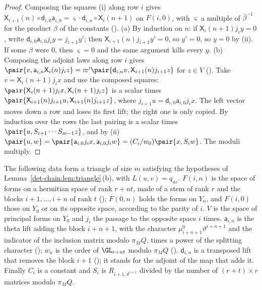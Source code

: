\begin{proof}
Composing the squares (i) along row $i$ gives
$\mathsf X_{i+1}(n)\circ \mathsf d_{i,0}\mathsf a_{i,0}=\varsigma\cdot \mathsf d_{i,n}\circ \mathsf X_i(n+1)$ on $F(i,0)$, with $\varsigma$ a multiple of
$\bar\beta^{-1}$ for the product $\beta$ of the constants
(). (a) By induction on $n$: if
$\mathsf X_i(n+1)j_iy=0$, write $\mathsf d_{i,0}\mathsf a_{i,0}j_iy=j_{i+1}y'$; then $\mathsf X_{i+1}(n)j_{i+1}y'=0$, so $y'=0$, so
$y=0$ by (ii). If some $\beta$ were $0$, then $\varsigma=0$ and the same argument kills every $y$.
(b) Composing the adjoint laws along row $i$ gives
$\pair{v,\mathsf a_{i,n}\mathsf X_i(n)j_iz}=\varpi'\pair{\mathsf d_{i,n}v,\mathsf X_{i+1}(n)j_{i+1}z}$ for $z\in V$
(). Take $v=\mathsf X_i(n+1)j_ix$ and use the composed
squares: $\pair{\mathsf X_i(n+1)j_ix,\mathsf X_i(n+1)j_iz}$ is a scalar times
$\pair{\mathsf X_{i+1}(n)j_{i+1}u,\mathsf X_{i+1}(n)j_{i+1}z}$, where $j_{i+1}u=\mathsf d_{i,0}\mathsf a_{i,0}j_ix$. The left
vector moves down a row and loses its first lift; the right one is only copied. By induction over
the rows the last pairing is a scalar times $\pair{u,S_{i+1}\cdots S_{m-1}z}$, and by (ii)
$\pair{u,w}=\pair{\mathsf a_{i,0}j_ix,\mathsf a_{i,0}j_iw}=(C_i/w_0)\pair{x,S_iw}$. The moduli multiply.
\end{proof}

\begin{theorem}
\label{det-chain:thm:triangle}
The following data form a triangle of size $m$ satisfying the hypotheses of
Lemma~\ref{det-chain:lem:triangle}\,(b), with $L(u,v)=q_{uv}$. $F(i,n)$ is the space of forms on a
hermitian space of rank $r+nt$, made of a stem of rank $r$ and the blocks $i+1,\dots,i+n$ of rank
$t$ (); $F(0,n)$ holds the forms on $Y_n$, and $F(i,0)$ those on $Y_0$
or on its opposite space, according to the parity of $i$. $V$ is the space of principal forms on $Y_0$ and $j_i$ the
passage to the opposite space $i$ times. $\mathsf a_{i,n}$ is the theta lift adding the block $i+n+1$, with
the character $\mu^0_{i+n+1}\vartheta^{i+n+1}$ and the indicator of the inclusion matrix modulo
$\pi_MQ$, times a power of the splitting character (); $w_n$ is the
order of $\GL_{r+nt}$ modulo $\pi_MQ$ (). $\mathsf d_{i,n}$ is a transposed lift that removes the block $i+1$
(); it stands for the adjoint of the map that adds it.
Finally $C_i$ is a constant and $S_i$ is $R_{i+1,\vartheta^{i+1}}$ divided by the number of
$(r+t)\times r$ matrices modulo $\pi_MQ$.
\end{theorem}

